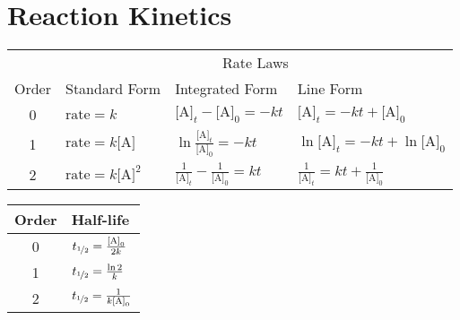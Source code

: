 \documentclass[10pt]{article}
\begin{document}
\section{Reaction Kinetics}

\begin{table}[H]
  \centering
    \begin{tabular}{clll}
    \toprule
    \multicolumn{1}{c}{} & \multicolumn{3}{c}{Rate Laws}\\
    \cmidrule(l){2-4} 
    Order & Standard Form & Integrated Form & Line Form \\
	\midrule
	0 & $\textrm{rate}=k$ & $\textrm{[A]}_t-\textrm{[A]}_0=-kt$ & $\textrm{[A]}_t=-kt+\textrm{[A]}_0$   \\[10pt]
	1 & $\textrm{rate}=k\textrm{[A]}$ & $\ln\frac{\textrm{[A]}_t}{\textrm{[A]}_0}=-kt$ & $\ln\textrm{[A]}_t=-kt+\ln\textrm{[A]}_0$  \\[10pt]
	2 & $\textrm{rate}=k\textrm{[A]}^2$ & $\frac{1}{\textrm{[A]}_t}-\frac{1}{\textrm{[A]}_0}=kt$ & $\frac{1}{\textrm{[A]}_t}=kt+\frac{1}{\textrm{[A]}_0}$  \\
    \bottomrule
    \end{tabular}%
    \label{tab:rate}%
\end{table}%

\begin{table}[H]
  \centering
    \begin{tabular}{cl}
    \toprule
    Order & Half-life\\
	\midrule
	0 & $t_{\nicefrac{1}{2}}=\frac{\textrm{[A]}_0}{2k}$ \\[10pt]
	1 & $t_{\nicefrac{1}{2}}=\frac{\ln 2}{k}$  \\[10pt]
	2 & $t_{\nicefrac{1}{2}}=\frac{1}{k\textrm{[A]}_0}$  \\
    \bottomrule
    \end{tabular}%
    \label{tab:half}%
\end{table}%

\end{document}
